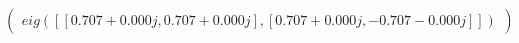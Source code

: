 \documentclass[border=1em]{standalone}
\begin{document}
$
\left(
\begin{array}{cc}
eig([[0.707+0.000j, 0.707+0.000j],[0.707+0.000j, -0.707-0.000j]])
\end{array}
\right)
$
\end{document}
